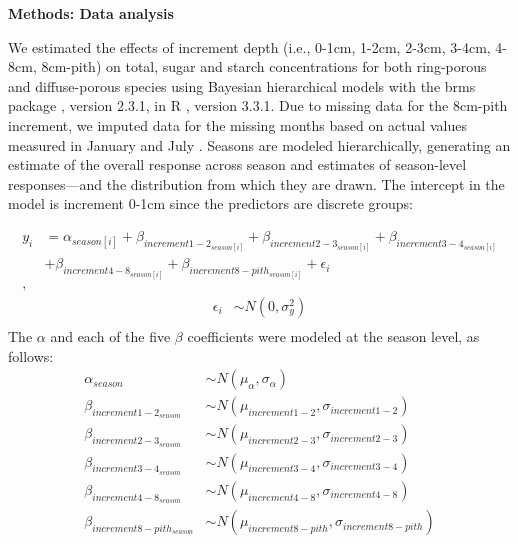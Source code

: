\documentclass{article}\usepackage[]{graphicx}\usepackage[]{color}
\begin{document}
\noindent 
\renewcommand{\thetable}{S\arabic{table}}
\renewcommand{\thefigure}{S\arabic{figure}}

\textbf{\LARGE{Methods: Data analysis}}

\par We estimated the effects of increment depth (i.e., 0-1cm, 1-2cm, 2-3cm, 3-4cm, 4-8cm, 8cm-pith) on total, sugar and starch concentrations for both ring-porous and diffuse-porous species using Bayesian hierarchical models with the brms package \citep{brms}, version 2.3.1,  in R \citep{R}, version 3.3.1. Due to missing data for the 8cm-pith increment, we imputed data for the missing months based on actual values measured in January and July \citep{Gelman2008}. Seasons are modeled hierarchically, generating an estimate of the overall response across season and estimates of season-level responses---and the distribution from which they are drawn. The intercept in the model is increment 0-1cm since the predictors are discrete groups:  

\begin{align*}
y_i &= \alpha_{season[i]} + \beta_{increment1-2_{season[i]}} + \beta_{increment2-3_{season[i]}} + \beta_{increment3-4_{season[i]}}\\
&+ \beta_{increment4-8_{season[i]}} + \beta_{increment8-pith_{season[i]}} + \epsilon_i\\,
\end{align*}
\begin{align*}
\epsilon_i & \sim N(0,\sigma^2_y) \\
\end{align*}
\noindent The $\alpha$ and each of the five $\beta$ coefficients were modeled at the season level, as follows:
\begin{align*}
\alpha_{season} & \sim N(\mu_{\alpha}, \sigma_{\alpha}) \\
\beta_{increment1-2_{season}} & \sim N(\mu_{increment1-2}, \sigma_{increment1-2}) \\
\beta_{increment2-3_{season}} & \sim N(\mu_{increment2-3}, \sigma_{increment2-3}) \\
\beta_{increment3-4_{season}} & \sim N(\mu_{increment3-4}, \sigma_{increment3-4}) \\
\beta_{increment4-8_{season}} & \sim N(\mu_{increment4-8}, \sigma_{increment4-8}) \\
\beta_{increment8-pith_{season}} & \sim N(\mu_{increment8-pith}, \sigma_{increment8-pith}) \\
\end{align*}
\end{document}
